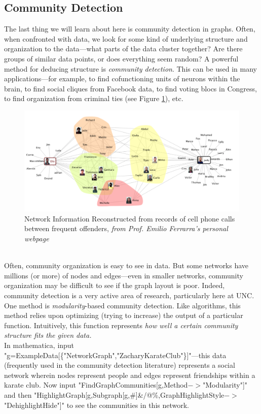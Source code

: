 \documentclass[12pt]{article}
\begin{document}
\subsection{Community Detection}
The last thing we will learn about here is community detection in graphs. Often, when confronted with data, we look for some kind of underlying structure and organization to the data---what parts of the data cluster together? Are there groups of similar data points, or does everything seem random? A powerful method for deducing structure is \emph{community detection}. This can be used in many applications---for example, to find cofunctioning units of neurons within the brain, to find social cliques from Facebook data, to find voting blocs in Congress, to find organization from criminal ties (see Figure \ref{crime}), etc.
\begin{figure}[htbp]
\begin{center}
\includegraphics[width=.8\linewidth]{crime}
\caption{Network Information Reconstructed from records of cell phone calls between frequent offenders, \emph{from Prof. Emilio Ferrarra's personal webpage}}
\label{crime}
\end{center}
\end{figure}
\\Often, community organization is easy to see in data. But some networks have millions (or more) of nodes and edges---even in smaller networks, community organization may be difficult to see if the graph layout is poor. Indeed, community detection is a very active area of research, particularly here at UNC. One method is \emph{modularity}-based community detection. Like algorithms, this method relies upon optimizing (trying to increase) the output of a particular function. Intuitively, this function represents \emph{how well a certain community structure fits the given data.} 
\\In mathematica, input "g=ExampleData[\{"NetworkGraph","ZacharyKarateClub"\}]"---this data (frequently used in the community detection literature) represents a social network wherein nodes represent people and edges represent friendships within a karate club. Now input "FindGraphCommunities[g,Method$->$"Modularity"]" and then "HighlightGraph[g,Subgraph[g,\#]\&/@\%,GraphHighlightStyle$->$"DehighlightHide"]" to see the communities in this network.
\end{document}
